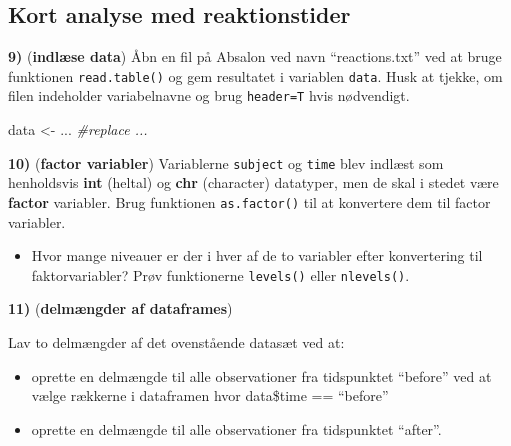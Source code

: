 \documentclass[
]{book}
\newenvironment{Shaded}{\begin{snugshade}}{\end{snugshade}}
\newcommand{\CommentTok}[1]{\textcolor[rgb]{0.56,0.35,0.01}{\textit{#1}}}
\newcommand{\DocumentationTok}[1]{\textcolor[rgb]{0.56,0.35,0.01}{\textbf{\textit{#1}}}}
\newcommand{\FunctionTok}[1]{\textcolor[rgb]{0.13,0.29,0.53}{\textbf{#1}}}
\newcommand{\NormalTok}[1]{#1}
\newcommand{\OtherTok}[1]{\textcolor[rgb]{0.56,0.35,0.01}{#1}}
\newcommand{\SpecialCharTok}[1]{\textcolor[rgb]{0.81,0.36,0.00}{\textbf{#1}}}
\providecommand{\tightlist}{%
  \setlength{\itemsep}{0pt}\setlength{\parskip}{0pt}}
\theoremstyle{definition}
\theoremstyle{definition}
\theoremstyle{definition}
\theoremstyle{definition}
\theoremstyle{remark}
\begin{document}
\subsection{Kort analyse med reaktionstider}\label{kort-analyse-med-reaktionstider}

\textbf{9)} (\textbf{indlæse data}) Åbn en fil på Absalon ved navn ``reactions.txt'' ved at bruge funktionen \texttt{read.table()} og gem resultatet i variablen \texttt{data}. Husk at tjekke, om filen indeholder variabelnavne og brug \texttt{header=T} hvis nødvendigt.

\begin{Shaded}
\begin{Highlighting}[]
\NormalTok{data }\OtherTok{\textless{}{-}}\NormalTok{ ... }\CommentTok{\#replace ...}
\end{Highlighting}
\end{Shaded}

\textbf{10)} (\textbf{factor variabler}) Variablerne \texttt{subject} og \texttt{time} blev indlæst som henholdsvis \textbf{int} (heltal) og \textbf{chr} (character) datatyper, men de skal i stedet være \textbf{factor} variabler. Brug funktionen \texttt{as.factor()} til at konvertere dem til factor variabler.

\begin{Shaded}
\end{Shaded}

\begin{itemize}
\tightlist
\item
  Hvor mange niveauer er der i hver af de to variabler efter konvertering til faktorvariabler? Prøv funktionerne \texttt{levels()} eller \texttt{nlevels()}.
\end{itemize}

\textbf{11)} (\textbf{delmængder af dataframes})

Lav to delmængder af det ovenstående datasæt ved at:

\begin{itemize}
\tightlist
\item
  oprette en delmængde til alle observationer fra tidspunktet ``before'' ved at vælge rækkerne i dataframen hvor data\$time == ``before''
\item
  oprette en delmængde til alle observationer fra tidspunktet ``after''.
\end{itemize}
\end{document}
